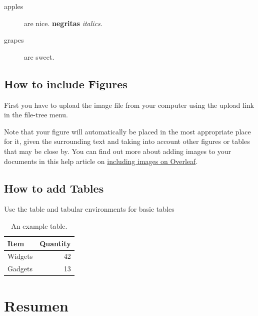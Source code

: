 \documentclass[12pt]{report} %
\begin{document}
\begin{description}
 \item[apples] are nice. \textbf{negritas} \textit{italics}.
 \item[grapes] are sweet.
\end{description}


\subsection{How to include Figures}
First you have to upload the image file from your computer using the upload link in the file-tree menu.  

Note that your figure will automatically be placed in the most appropriate place for it, given the surrounding text and taking into account other figures or tables that may be close by. You can find out more about adding images to your documents in this help article on \href{https://www.overleaf.com/learn/how-to/Including_images_on_Overleaf}{including images on Overleaf}.
 

\subsection{How to add Tables}

Use the table and tabular environments for basic tables  



\begin{table}
\centering
\begin{tabular}{l|r}

Item & Quantity \\
\hline

Widgets & 42 \\

Gadgets & 13
\end{tabular}
\caption{\label{tab:widgets}An example table.}
\end{table}





\section{Resumen}
\end{document}
